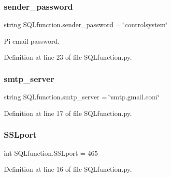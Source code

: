 \subsubsection{sender\+\_\+password}
{\footnotesize\ttfamily string S\+Q\+Lfunction.\+sender\+\_\+password = \char`\"{}controlsystem\char`\"{}}



Pi email password. 



Definition at line 23 of file S\+Q\+Lfunction.\+py.

\mbox{\label{namespace_s_q_lfunction_afc238002d1e4aeb7f8d2e10d47dfad36}} 
\subsubsection{smtp\+\_\+server}
{\footnotesize\ttfamily string S\+Q\+Lfunction.\+smtp\+\_\+server = \char`\"{}smtp.\+gmail.\+com\char`\"{}}



Definition at line 17 of file S\+Q\+Lfunction.\+py.

\mbox{\label{namespace_s_q_lfunction_a700c01c62cb7f1ed2561f5e640da46cf}} 
\subsubsection{S\+S\+Lport}
{\footnotesize\ttfamily int S\+Q\+Lfunction.\+S\+S\+Lport = 465}



Definition at line 16 of file S\+Q\+Lfunction.\+py.

